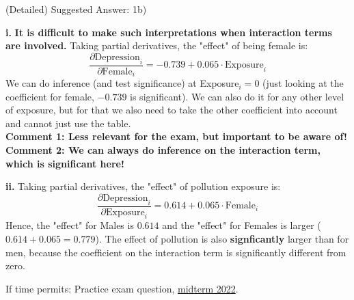 \documentclass[11pt]{beamer}
\begin{document}
\begin{frame}{(Detailed) Suggested Answer: 1b)  }
\footnotesize{
\textbf{i.} \textbf{It is difficult to make such interpretations when interaction terms are involved.} Taking partial derivatives, the "effect" of being female is:
$$ \frac{\partial \text{Depression}_i}{\partial \text{Female}_i} = -0.739 + 0.065\cdot \text{Exposure}_i $$
We can do inference (and test significance) at Exposure$_i=0$ (just looking at the coefficient for female, $-0.739$ is significant). We can also do it for any other level of exposure, but for that we also need to take the other coefficient into account and cannot just use the table.\\
\textbf{Comment 1: Less relevant for the exam, but important to be aware of!} \\
\textbf{Comment 2: We can always do inference on the interaction term, which is significant here!} 

\textbf{ii.} Taking partial derivatives, the "effect" of pollution exposure is:
$$ \frac{\partial \text{Depression}_i}{\partial \text{Exposure}_i} = 0.614 + 0.065\cdot \text{Female}_i $$
Hence, the "effect" for Males is $0.614$ and the "effect" for Females is larger ($0.614+0.065 = 0.779$). The effect of pollution is also \textbf{signficantly} larger than for men, because the coefficient on the interaction term is significantly different from zero.
}
\end{frame}


\begin{frame}
If time permits: Practice exam question, \href{https://drive.google.com/drive/u/4/folders/1-cQBZhZluOgRleSDZocxRj2OYfL8uOmj}{midterm 2022}.
\end{frame}
\end{document}
